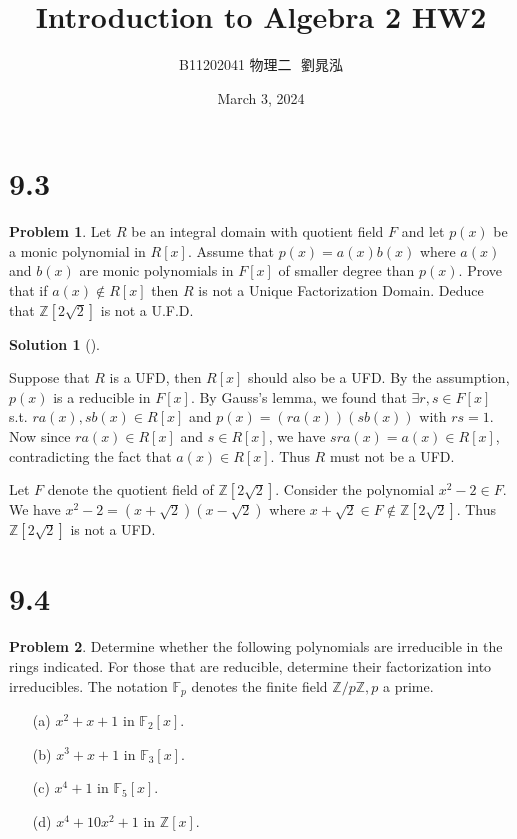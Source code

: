 \documentclass{article}
\title{Introduction to Algebra 2 HW2}
\author{B11202041 物理二 $ $ 劉晁泓}
\date{March 3, 2024}
\theoremstyle{definition}
\newtheorem{prob}{Problem}
\newtheorem*{sol}{Solution}
\newenvironment{sols}[1][]{%
  \begin{sol}[#1]$ $\par\nobreak\ignorespaces
}{%
  \end{sol}
}
\begin{document}
\maketitle
\thispagestyle{fancy}
\renewcommand{\footrulewidth}{0.4pt}
\cfoot{\thepage}
\renewcommand{\headrulewidth}{0.4pt}

\section*{9.3}

\begin{prob}
	Let $R$ be an integral domain with quotient field $F$ and let $p(x)$ be a monic polynomial in $R[x]$. 
	Assume that $p(x) = a(x) b(x)$ where $a(x)$ and $b(x)$ are monic polynomials in $F[x]$ of smaller degree than $p(x)$. 
	Prove that if $a(x) \notin R[x]$ then $R$ is not a Unique Factorization Domain. 
	Deduce that $\mathbb{Z}[2\sqrt{2}]$ is not a U.F.D.
\end{prob}

\begin{sols}
	\par Suppose that $R$ is a UFD, then $R[x]$ should also be a UFD.
	By the assumption, $p(x)$ is a reducible in $F[x]$. 
	By Gauss's lemma, we found that $\exists r, s \in F[x]$ s.t. $r a(x), s b(x) \in R[x]$ and $p(x) = (r a(x)) (s b(x))$ with $rs = 1$.
	Now since $ra(x) \in R[x]$ and $s \in R[x]$, we have $s r a(x) = a(x) \in R[x]$, contradicting the fact that $a(x) \in R[x]$.
	Thus $R$ must not be a UFD.
	\par Let $F$ denote the quotient field of $\mathbb{Z}[2 \sqrt{2}]$.
	Consider the polynomial $x^2 - 2 \in F$.  
	We have $x^2 - 2 = (x + \sqrt{2})(x - \sqrt{2})$ where $x + \sqrt{2} \in F \notin \mathbb{Z}[2\sqrt{2}]$.
	Thus $\mathbb{Z}[2\sqrt{2}]$ is not a UFD.
\end{sols}

\section*{9.4}

\setcounter{prob}{0}
\begin{prob}
	Determine whether the following polynomials are irreducible in the rings indicated. 
	For those that are reducible, determine their factorization into irreducibles. 
	The notation $\mathbb{F}_p$ denotes the finite field $\mathbb{Z}/p\mathbb{Z}, p$ a prime.
	\begin{enumerate}
		\item[(a)] $x^2 + x + 1$ in $\mathbb{F}_2[x]$. 

		\item[(b)] $x^3 + x + 1$ in $\mathbb{F}_3[x]$. 

		\item[(c)] $x^4 + 1$ in $\mathbb{F}_5[x]$. 

		\item[(d)] $x^4 + 10 x^2 + 1$ in $\mathbb{Z}[x]$.
	\end{enumerate}
\end{prob}
\end{document}

